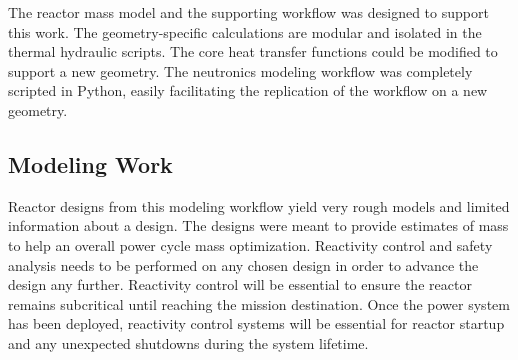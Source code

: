 The reactor mass model and the supporting workflow was designed to support this
work. The geometry-specific calculations are modular and isolated in the thermal
hydraulic scripts. The core heat transfer functions could be modified to support
a new geometry. The neutronics modeling workflow was completely scripted in
Python, easily facilitating the replication of the workflow on a new geometry.

\subsection{Modeling Work}
Reactor designs from this modeling workflow yield very rough models and limited
information about a design. The designs were meant to provide estimates of mass
to help an overall power cycle mass optimization. Reactivity control and safety
analysis needs to be performed on any chosen design in order to advance the
design any further. Reactivity control will be essential to ensure the reactor
remains subcritical until reaching the mission destination. Once the power
system has been deployed, reactivity control systems will be essential for
reactor startup and any unexpected shutdowns during the system lifetime.
